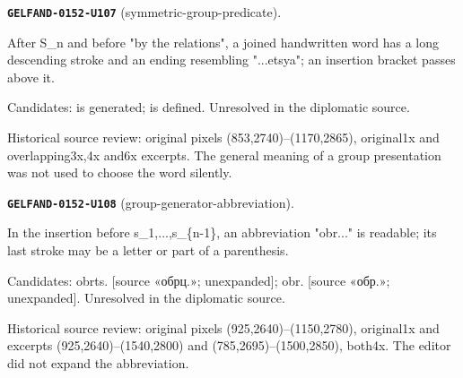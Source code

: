 \par\noindent\leavevmode{}\label{GELFAND-0152-U107}\textbf{\texttt{GELFAND-0152-U107}} (symmetric-group-predicate).\nopagebreak[4]\par
After S\_n and before "by the relations", a joined handwritten word has a long descending stroke and an ending resembling "...etsya"; an insertion bracket passes above it.\par
Candidates: is generated; is defined. Unresolved in the diplomatic source.\par
Historical source review: original pixels (853,2740)–(1170,2865), original1x and overlapping3x,4x and6x excerpts. The general meaning of a group presentation was not used to choose the word silently.\par\medskip
\par\noindent\leavevmode{}\label{GELFAND-0152-U108}\textbf{\texttt{GELFAND-0152-U108}} (group-generator-abbreviation).\nopagebreak[4]\par
In the insertion before s\_1,...,s\_\{n-1\}, an abbreviation "obr..." is readable; its last stroke may be a letter or part of a parenthesis.\par
Candidates: obrts. [source «обрц.»; unexpanded]; obr. [source «обр.»; unexpanded]. Unresolved in the diplomatic source.\par
Historical source review: original pixels (925,2640)–(1150,2780), original1x and excerpts (925,2640)–(1540,2800) and (785,2695)–(1500,2850), both4x. The editor did not expand the abbreviation.\par\medskip
